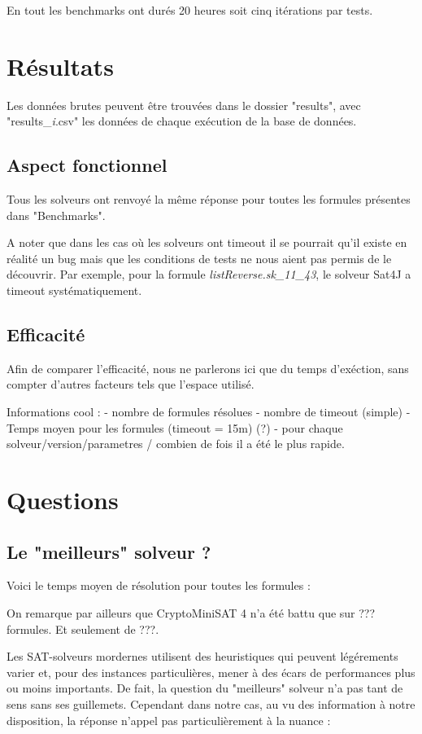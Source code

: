 \documentclass[11pt,a4paper]{article}
\begin{document}
En tout les benchmarks ont durés 20 heures soit cinq itérations par tests.


\section{Résultats}

Les données brutes peuvent être trouvées dans le dossier "results", avec "results\_\textit{i}.csv" les données de chaque exécution de la base de données.

\subsection{Aspect fonctionnel}

Tous les solveurs ont renvoyé la même réponse pour toutes les formules présentes dans "Benchmarks".

A noter que dans les cas où les solveurs ont timeout il se pourrait qu'il existe en réalité un bug mais que les conditions de tests ne nous aient pas permis de le découvrir. Par exemple, pour
la formule \textit{listReverse.sk\_11\_43}, le solveur Sat4J a timeout systématiquement.

\subsection{Efficacité}

Afin de comparer l'efficacité, nous ne parlerons ici que du temps d'exéction, sans compter d'autres facteurs tels que l'espace utilisé.

Informations cool : 
- nombre de formules résolues
- nombre de timeout (simple)
- Temps moyen pour les formules (timeout = 15m) (?)
- pour chaque solveur/version/parametres / combien de fois il a été le plus rapide.


\section{Questions}

\subsection{Le "meilleurs" solveur ?}

Voici le temps moyen de résolution pour toutes les formules :

On remarque par ailleurs que CryptoMiniSAT 4 n'a été battu que sur
??? formules. Et seulement de ???.

Les SAT-solveurs mordernes utilisent des heuristiques qui peuvent légérements varier et, pour des instances particulières, mener à des écars de performances plus ou moins importants. De fait, la question du "meilleurs" solveur n'a pas tant de sens sans ses guillemets. Cependant dans notre cas, au vu des information à notre disposition, la réponse n'appel pas particulièrement à la nuance :
\end{document}
